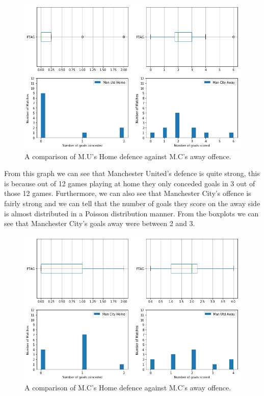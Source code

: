 \documentclass[12pt]{report}
\begin{document}
\begin{figure}[ht]
  \centering
      \includegraphics[width=1\textwidth]{fig1}
  \caption{A comparison of M.U's Home defence against M.C's away offence.}
\end{figure}
\vspace{0.3cm}

From this graph we can see that Manchester United's defence is quite strong, this is because out of 12 games playing at home they only conceded goals in 3 out of those 12 games. Furthermore, we can also see that Manchester City's offence is fairly strong and we can tell that the number of goals they score on the away side is almost distributed in a Poisson distribution manner. From the boxplots we can see that Manchester City's goals away were between 2 and 3. 

\newpage
\begin{figure}[ht]
  \centering
      \includegraphics[width=1\textwidth]{fig2}
  \caption{A comparison of M.C's Home defence against M.C's away offence.}
\end{figure}
\vspace{0.3cm}
\end{document}
